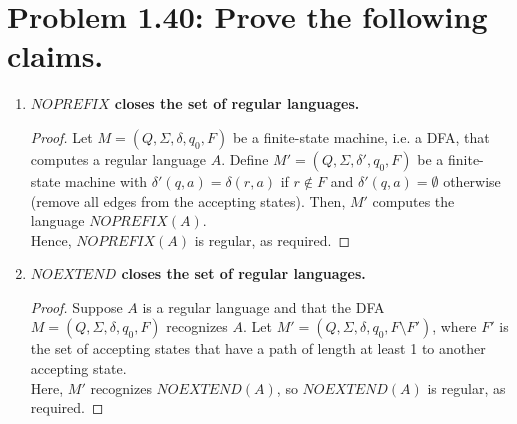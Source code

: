\documentclass[12pt]{article}
\begin{document}
\section*{Problem 1.40: Prove the following claims.}
\begin{enumerate}[label=(\alph*)]
\item \textbf{$NOPREFIX$ closes the set of regular languages.}
  \begin{proof}
    Let $M = (Q, \Sigma, \delta, q_{0}, F)$ be a finite-state machine, i.e. a DFA, that computes a regular language $A$. Define $M' = (Q, \Sigma, \delta', q_{0}, F)$ be a finite-state machine with $\delta'(q, a) = \delta(r, a)$ if $r \notin F$ and $\delta'(q, a) = \emptyset$ otherwise (remove all edges from the accepting states). Then, $M'$ computes the language $NOPREFIX(A)$. \\
    \newline
    Hence, $NOPREFIX(A)$ is regular, as required.
  \end{proof}

\item \textbf{$NOEXTEND$ closes the set of regular languages.}
  \begin{proof}
    Suppose $A$ is a regular language and that the DFA $M = (Q, \Sigma, \delta, q_{0}, F)$ recognizes $A$. Let $M' = (Q, \Sigma, \delta, q_{0}, F \setminus F')$, where $F'$ is the set of accepting states that have a path of length at least 1 to another accepting state. \\
    \newline
    Here, $M'$ recognizes $NOEXTEND(A)$, so $NOEXTEND(A)$ is regular, as required.
  \end{proof}
\end{enumerate}
\end{document}
